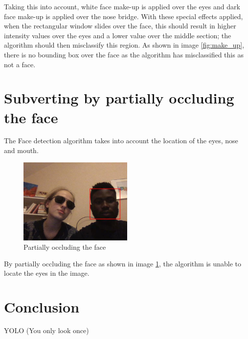 \documentclass[a4paper,12pt]{article}
\begin{document}
Taking this into account, white face make-up is applied over the eyes and dark face make-up is applied over the nose bridge. With these special effects applied, when the rectangular window slides over the face, this should result in higher intensity values over the eyes and a lower value over the middle section; the algorithm should then misclassify this region. As shown in image \ref{fig:make_up}, there is no bounding box over the face as the algorithm has misclassified this as not a face.


\section{Subverting by partially occluding the face}
The Face detection algorithm takes into account the location of the eyes, nose and mouth. 
	\begin{figure} 
		\centering
		\includegraphics[width=0.5\textwidth]{images/spoof_julia_aj}
		\caption{Partially occluding the face}
		\label{fig:julia}
	\end{figure}
By partially occluding the face as shown in image \ref{fig:julia}, the algorithm is unable to locate the eyes in the image. 


\section{Conclusion}
YOLO (You only look once)
\end{document}

